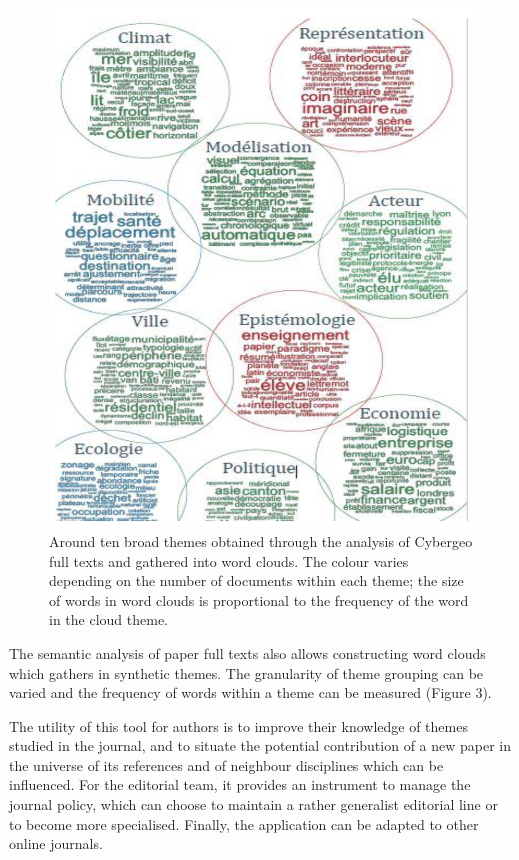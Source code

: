 \documentclass[11pt]{article}
\begin{document}
\begin{figure}[h!]
	\includegraphics[width=\linewidth]{Fig3.png}	
	\caption{Around ten broad themes obtained through the analysis of Cybergeo full texts and gathered into word clouds. The colour varies depending on the number of documents within each theme; the size of words in word clouds is proportional to the frequency of the word in the cloud theme.}
\end{figure}


The semantic analysis of paper full texts also allows constructing word clouds which gathers in synthetic themes. The granularity of theme grouping can be varied and the frequency of words within a theme can be measured (Figure 3).



\bigskip

The utility of this tool for authors is to improve their knowledge of themes studied in the journal, and to situate the potential contribution of a new paper in the universe of its references and of neighbour disciplines which can be influenced. For the editorial team, it provides an instrument to manage the journal policy, which can choose to maintain a rather generalist editorial line or to become more specialised. Finally, the application can be adapted to other online journals.
\end{document}

